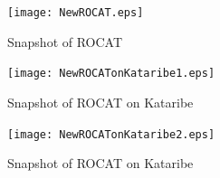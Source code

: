 \documentclass[conference]{IEEEtran}
\begin{document}
\begin{figure}[t!]
\centering
\texttt{[image: NewROCAT.eps]}
\caption{Snapshot of ROCAT}
\label{figure:new-rocat}
\end{figure}

\begin{figure}[t!]
\centering
\texttt{[image: NewROCATonKataribe1.eps]}
\caption{Snapshot of ROCAT on Kataribe}
\label{figure:new-rocat-on-kataribe1}
\end{figure}

\begin{figure}[t!]
\centering
\texttt{[image: NewROCATonKataribe2.eps]}
\caption{Snapshot of ROCAT on Kataribe}
\label{figure:new-rocat-on-kataribe2}
\end{figure}



\end{document}
